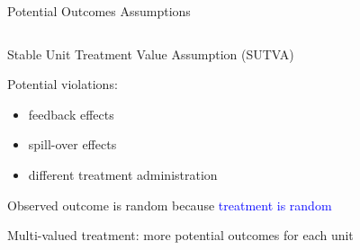 \documentclass[notes,11pt, aspectratio=169, usenames, dvipsnames]{beamer}
\newenvironment{wideitemize}{\itemize\addtolength{\itemsep}{10pt}}{\enditemize}
\begin{document}
\begin{frame}{Potential Outcomes Assumptions}
\begin{columns}[c]
\begin{column}{0.5\textwidth}
{			\begin{wideitemize}
				\item Stable Unit Treatment Value Assumption (SUTVA)
				\item Potential violations:
				\begin{itemize}
					\item feedback effects
					\item spill-over effects
					\item different treatment administration
				\end{itemize}
				\item Observed outcome is random because \textcolor{blue}{treatment is random}
				\item Multi-valued treatment: more potential outcomes for each unit
			\end{wideitemize}	
	}
		\end{column}
	\end{columns}
\end{frame}
\end{document}
